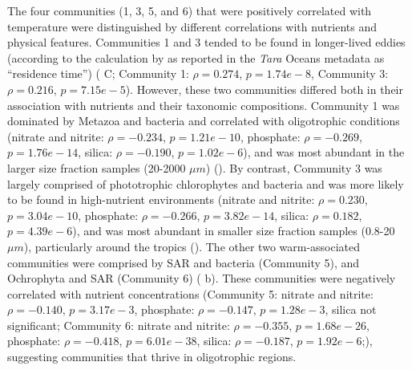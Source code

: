 \documentclass[12pt]{article}
\numberwithin{equation}{section}
\begin{document}
The four communities (1, 3, 5, and 6) that were positively correlated with temperature were distinguished by different correlations with nutrients and physical features. Communities 1 and 3 tended to be found in longer-lived eddies (according to the calculation by \cite{d2010fluid} as reported in the \textit{Tara} Oceans metadata \cite{taraoceansconsortium2016ecoa} as ``residence time'') ( C; Community 1: $\rho=0.274$, $p=1.74e-8$, Community 3: $\rho=0.216$, $p=7.15e-5$). However, these two communities differed both in their association with nutrients and their taxonomic compositions. Community 1 was dominated by Metazoa and bacteria and correlated with oligotrophic conditions (nitrate and nitrite: $\rho=-0.234$, $p=1.21e-10$, phosphate: $\rho=-0.269$, $p=1.76e-14$, silica: $\rho=-0.190$, $p=1.02e-6$),  and was most abundant in the larger size fraction samples (20-2000 $\mu m$) (). By contrast, Community 3 was largely comprised of phototrophic chlorophytes and bacteria and was more likely to be found in high-nutrient environments (nitrate and nitrite: $\rho=0.230$, $p=3.04e-10$, phosphate: $\rho=-0.266$, $p=3.82e-14$, silica: $\rho=0.182$, $p=4.39e-6$), and was most abundant in smaller size fraction samples (0.8-20 $\mu m$), particularly around the tropics (). The other two warm-associated communities were comprised by SAR and bacteria (Community 5), and Ochrophyta and SAR (Community 6) ( b). These communities were negatively correlated with nutrient concentrations (Community 5: nitrate and nitrite: $\rho=-0.140$, $p=3.17e-3$, phosphate: $\rho=-0.147$, $p=1.28e-3$, silica not significant; Community 6: nitrate and nitrite: $\rho=-0.355$, $p=1.68e-26$, phosphate: $\rho=-0.418$, $p=6.01e-38$, silica: $\rho=-0.187$, $p=1.92e-6$;), suggesting communities that thrive in oligotrophic regions.
\end{document}
